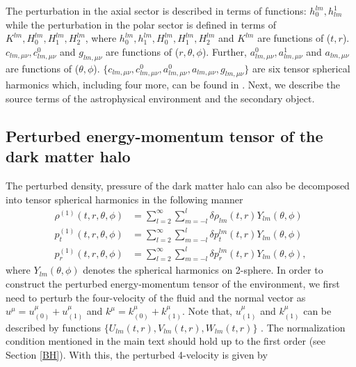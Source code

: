 \documentclass[11pt]{article}
\begin{document}
The perturbation in the axial sector is described in terms of functions: $h_{0}^{lm}, h^{1}_{lm}$ while the perturbation in the polar sector is defined in terms of $K^{lm}, H_{0}^{lm}, H_{1}^{lm}, H_{2}^{lm}$,%
where $h_{0}^{lm}, h_{1}^{lm}, H_{0}^{lm}, H_{1}^{lm}, H_{2}^{lm}$ and $K^{lm}$ are functions of ($t, r$). $c_{lm,\mu\nu}, c^{0}_{lm,\mu\nu}$ and $g_{lm,\mu\nu}$ are functions of ($r, \theta, \phi$). Further, $a^{0}_{lm,\mu\nu}, a^{1}_{lm,\mu\nu}$ and $a_{lm,\mu\nu}$ are functions of ($\theta, \phi$). $\{c_{lm,\mu\nu}, c^{0}_{lm,\mu\nu}, a^{0}_{lm,\mu\nu}, a_{lm,\mu\nu}, g_{lm,\mu\nu}\}$ are six tensor spherical harmonics which, including four more, can be found in \cite{PhysRevD.67.104017}. Next, we describe the source terms of the astrophysical environment and the secondary object.

\subsection{Perturbed energy-momentum tensor of the dark matter halo}
The perturbed density, pressure of the dark matter halo can also be decomposed into tensor spherical harmonics in the following manner 
\begin{align}
\rho^{(1)}(t,r,\theta,\phi)&=\sum_{l=2}^\infty\sum_{m=-l}^{l}\delta \rho_{l m}(t,r)Y_{l m}(\theta,\phi) \nonumber \\
p^{(1)}_t(t,r,\theta,\phi)&=\sum_{l=2}^\infty\sum_{m=-l}^{l}\delta p_{t}^{l m}(t,r)Y_{l m}(\theta,\phi) \nonumber \\
p^{(1)}_r(t,r,\theta,\phi)&=\sum_{l=2}^\infty\sum_{m=-l}^{l}\delta p_{r}^{l m}(t,r)Y_{l m}(\theta,\phi),
\label{math:prepertrad}
\end{align} 
where $Y_{lm}(\theta, \phi)$ denotes the spherical harmonics on 2-sphere.
In order to construct the perturbed energy-momentum tensor of the environment, we first need to perturb the four-velocity of the fluid and the normal vector as $u^{\mu}=u^{\mu}_{(0)}+u^{\mu}_{(1)}$ and  $k^{\mu}=k^{\mu}_{(0)}+k^{\mu}_{(1)}$. Note that, $u^{\mu}_{(1)}$ and $k^{\mu}_{(1)}$ can be described by functions $\{U_{l m}(t,r), V_{l m}(t,r), W_{l m}(t,r)\}$ \cite{PhysRevD.67.104017}. The normalization condition mentioned in the main text should hold up to the first order (see Section \ref{BH}). With this, the perturbed 4-velocity is given by
\end{document}
